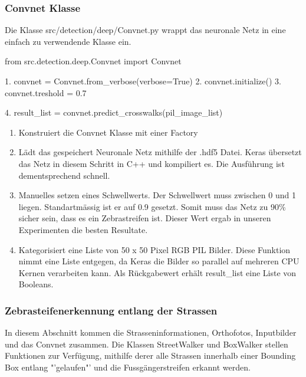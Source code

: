 \subsubsection{Convnet Klasse}
Die Klasse src/detection/deep/Convnet.py wrappt das neuronale Netz in eine einfach zu verwendende Klasse ein.
\begin{python}
	   from src.detection.deep.Convnet import Convnet
	   
	1. convnet = Convnet.from_verbose(verbose=True)
	2. convnet.initialize()
	3. convnet.treshold = 0.7
	
	4. result_list = convnet.predict_crosswalks(pil_image_list)
\end{python}
\begin{enumerate}
	\item Konstruiert die Convnet Klasse mit einer Factory
	\item Lädt das gespeichert Neuronale Netz mithilfe der .hdf5 Datei. Keras übersetzt das Netz in diesem Schritt in C++ und kompiliert es. Die Ausführung ist dementsprechend schnell.
	\item Manuelles setzen eines Schwellwerts. Der Schwellwert muss zwischen 0 und 1 liegen. Standartmässig ist er auf 0.9 gesetzt. Somit muss das Netz zu 90\% sicher sein, dass es ein Zebrastreifen ist. Dieser Wert ergab in unseren Experimenten die besten Resultate.
	\item Kategorisiert eine Liste von 50 x 50 Pixel RGB PIL Bilder. Diese Funktion nimmt eine Liste entgegen, da Keras die Bilder so parallel auf mehreren CPU Kernen verarbeiten kann. Als Rückgabewert erhält result\_list eine Liste von Booleans.
\end{enumerate}

\subsubsection{Zebrasteifenerkennung entlang der Strassen}
In diesem Abschnitt kommen die Strasseninformationen, Orthofotos, Inputbilder und das Convnet zusammen. Die Klassen StreetWalker und BoxWalker stellen Funktionen zur Verfügung, mithilfe derer alle Strassen innerhalb einer Bounding Box entlang "'gelaufen"' und die Fussgängerstreifen erkannt werden.

